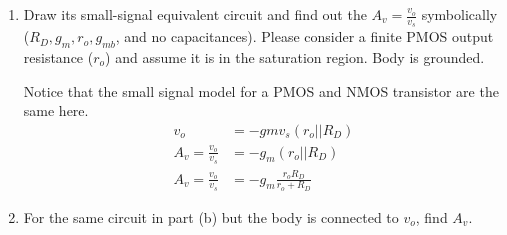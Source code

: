\begin{enumerate}
\begin{enumerate}
        \item Draw its small-signal equivalent circuit and find out the $A_v = \frac{v_o}{v_s}$ symbolically ($R_D, g_m, r_o, g_{mb}$, and no capacitances). Please consider a finite PMOS output resistance ($r_o$) and assume it is in the saturation region. Body is grounded.
        \begin{Ans}
            
            Notice that the small signal model for a PMOS and NMOS transistor are the same here.
            \begin{align*}
                v_o &= -gm v_s (r_o || R_D) \\
                A_v = \frac{v_o}{v_s} &= -g_m (r_o || R_D) \\
                A_v = \frac{v_o}{v_s} &= -g_m \frac{r_o R_D}{r_o + R_D}
            \end{align*}
        \end{Ans}

        \item For the same circuit in part (b) but the body is connected to $v_o$, find $A_v$.
        \begin{Ans}
            
        \end{Ans}
    \end{enumerate}
\end{enumerate}

























































